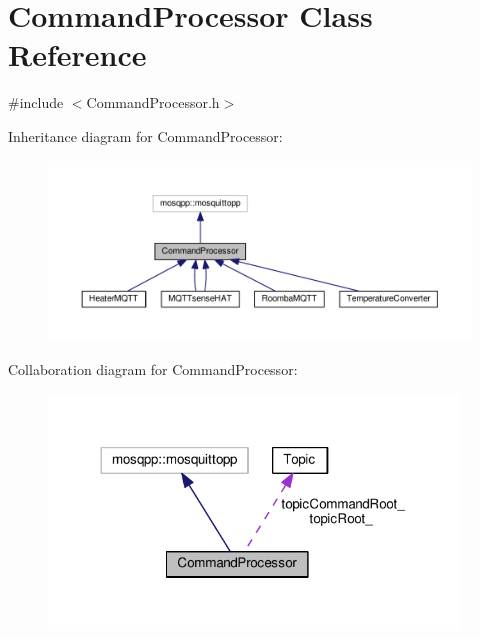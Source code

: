 \hypertarget{class_command_processor}{}\section{Command\+Processor Class Reference}
\label{class_command_processor}


{\ttfamily \#include $<$Command\+Processor.\+h$>$}



Inheritance diagram for Command\+Processor\+:
\nopagebreak
\begin{figure}[H]
\begin{center}
\leavevmode
\includegraphics[width=350pt]{class_command_processor__inherit__graph}
\end{center}
\end{figure}


Collaboration diagram for Command\+Processor\+:
\nopagebreak
\begin{figure}[H]
\begin{center}
\leavevmode
\includegraphics[width=308pt]{class_command_processor__coll__graph}
\end{center}
\end{figure}
